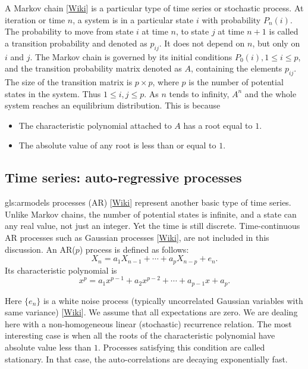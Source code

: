 \documentclass[oneside,10pt]{book}
\begin{document}
A \textcolor{index}{Markov chain} [\href{https://en.wikipedia.org/wiki/Markov_chain}{Wiki}] is a particular type of  time series or stochastic process. At iteration or time $n$, a system is in a particular state $i$ with probability $P_n(i)$. The probability to move from state $i$ at time $n$, to state $j$ at time $n + 1$ is called a transition probability and denoted as $p_{ij}$. It does not depend on $n$, but only on $i$ and $j$. The Markov chain is governed by its initial conditions $P_0(i), 1\leq i\leq p$, and the transition probability matrix denoted as $A$, containing the elements $p_{ij}$. The size of the transition matrix is 
$p \times p$, where $p$ is the number of potential states in the system. Thus $1\leq i,j\leq p$. As $n$ tends to infinity, $A^n$ and the whole system reaches an equilibrium distribution. This is because

\begin{itemize}
\item	The \textcolor{index}{characteristic polynomial} attached to $A$ has a root equal to $1$. 
\item	The absolute value of any root is less than or equal to $1$.
\end{itemize}

\subsection{Time series: auto-regressive processes}\label{tslineas}

\Gls{gls:armodels} processes (AR) [\href{https://en.wikipedia.org/wiki/Autoregressive_model}{Wiki}] represent another basic type of time series. Unlike Markov chains, the number of potential states is infinite, and a state can any real value, not just an integer. Yet the time is still discrete. Time-continuous AR processes such as \textcolor{index}{Gaussian processes} [\href{https://en.wikipedia.org/wiki/Gaussian_process}{Wiki}], are not included in this discussion. An AR($p$) process is defined as follows:
$$
X_n=a_1 X_{n-1}+ \cdots+ a_p X_{n-p} + e_n.
$$
Its \textcolor{index}{characteristic polynomial} is
\begin{equation}\label{rootcp}
x^p=a_1 x^{p-1}+a_2 x^{p-2}+\cdots + a_{p-1}x +a_p.
\end{equation}

\noindent Here $\{ e_n \}$ is a \textcolor{index}{white noise} process (typically uncorrelated Gaussian variables with same variance) [\href{https://en.wikipedia.org/wiki/White_noise}{Wiki}]. We assume that all expectations are zero. We are dealing here with a non-homogeneous linear (stochastic) recurrence relation. The most interesting case is when all the roots of the characteristic polynomial have absolute value less than $1$. Processes satisfying this condition are called 
\textcolor{index}{stationary}. In that case, the \textcolor{index}{auto-correlations} are decaying exponentially fast.
\end{document}
